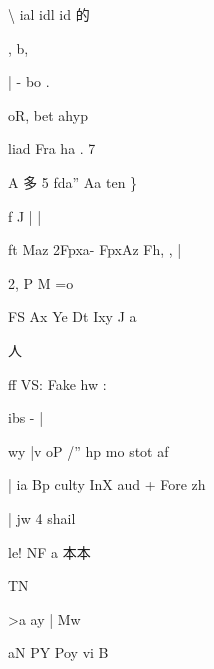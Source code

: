 \documentclass[UTF8,12pt,a4paper,openany]{ctexbook}
\begin{document}
\begin{enumerate}[label=\textbf{\arabic*.},leftmargin=2em]
\textbackslash{}                 ial idl id 的\par ,                       b,\par |            -          bo                                                  .\par oR,                                     bet ahyp\par liad          Fra        ha              .           7\par A         多          5            fda”    Aa ten                               \}\par f J                            |                                          |\par ft           Maz 2Fpxa- FpxAz Fh,                                      , |\par 2, P                                M =o\par FS                 Ax Ye Dt Ixy                   J     a\par 人\par ff  VS:       Fake hw              :\par [上 ena alee                 :\par pn      it 4  + zy 2二|\par D leo          wv Mts bxI- 244 = 人-= kvm,            7\par .                                                                                          1.v\par NO\par A ae FRED\par \par 【第 8 页，来源：ocr】\par CACM EI 931 O31,80.9\par 和 is,          tof]              ibs -                            |\par wy |v oP  /”     hp   mo stot af\par |        ia      Bp culty              InX aud + Fore zh\par |                  jw     4 shail\par le!   NF     a 本本\par TN\par >a ay  | Mw\par aN      PY Poy vi  B\par 
\end{enumerate}
\end{document}
